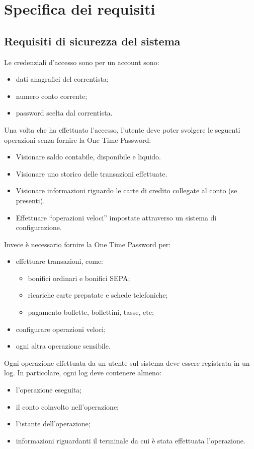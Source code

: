 
\section{Specifica dei requisiti}

\subsection{Requisiti di sicurezza del sistema}
 
Le credenziali d'accesso sono per un account sono:
\begin{itemize}
	\item dati anagrafici del correntista;
	\item numero conto corrente;
	\item password scelta dal correntista.
\end{itemize}
	
Una volta che ha effettuato l'accesso,  l'utente deve poter svolgere le seguenti operazioni senza fornire la One Time Password:
\begin{itemize}
	\item Visionare saldo contabile, disponibile e liquido.
	\item Visionare uno storico delle transazioni effettuate.
	\item Visionare informazioni riguardo le carte di credito collegate al conto (se presenti).
	\item Effettuare ``operazioni veloci'' impostate attraverso un sistema di configurazione.
\end{itemize}

Invece è necessario fornire la One Time Password per:
\begin{itemize}
	\item effettuare transazioni, come:
	\begin{itemize}
		\item bonifici ordinari e bonifici SEPA;
		\item ricariche carte prepatate e schede telefoniche;
		\item pagamento bollette, bollettini, tasse, etc;
	\end{itemize}
	\item configurare operazioni veloci;
	\item ogni altra operazione sensibile.
\end{itemize}

Ogni operazione effettuata da un utente sul sistema deve essere registrata in un log.
In particolare, ogni log deve contenere almeno:
\begin{itemize}
	\item l'operazione eseguita;
	\item il conto coinvolto nell'operazione;
	\item l'istante dell'operazione;
	\item informazioni riguardanti il terminale da cui \`e stata effettuata l'operazione.
\end{itemize}